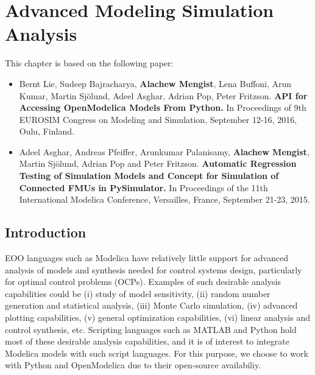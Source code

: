 

\chapter{Advanced Modeling Simulation Analysis}
\label{cha:python}


This chapter is based on the following paper:

\begin{itemize}
		
	\item Bernt Lie, Sudeep Bajracharya, \textbf{Alachew Mengist}, Lena Buffoni, Arun Kumar, Martin Sj\"{o}lund, Adeel Asghar, Adrian Pop, Peter Fritzson.\textbf{ API for Accessing OpenModelica Models From Python.} In Proceedings of 9th EUROSIM Congress on Modeling and Simulation, September 12-16, 2016, Oulu, Finland. 
	
	\item Adeel Asghar, Andreas Pfeiffer, Arunkumar Palanisamy, \textbf{Alachew Mengist}, Martin Sj\"{o}lund, Adrian Pop and Peter Fritzson.\textbf{ Automatic Regression Testing of Simulation Models and Concept for Simulation of Connected FMUs in PySimulator.} In Proceedings of the 11th International Modelica Conference, Versailles, France, September 21-23, 2015. 
		
\end{itemize}

\section{Introduction}
\label{sec:pythonintroduction}

EOO languages such as Modelica have relatively little support for advanced analysis of models and synthesis needed for control systems design, particularly for optimal control problems (OCPs). Examples of such desirable analysis capabilities could be (i) study of model sensitivity, (ii) random number generation and statistical analysis, (iii) Monte Carlo simulation, (iv) advanced plotting capabilities, (v) general optimization capabilities, (vi) linear analysis and control synthesis, etc. Scripting languages such as MATLAB and Python hold most of these desirable analysis capabilities, and it is of interest to integrate Modelica models with such script languages. For this purpose, we choose to work with Python and OpenModelica due to their open-source availabiliy.

